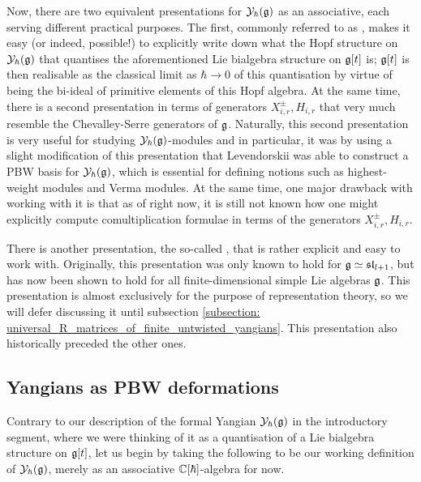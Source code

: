     Now, there are two equivalent presentations for $\mathcal{Y}_{\hbar}(\mathfrak{g})$ as an associative, each serving different practical purposes. The first, commonly referred to as , makes it easy (or indeed, possible!) to explicitly write down what the Hopf structure on $\mathcal{Y}_{\hbar}(\mathfrak{g})$ that quantises the aforementioned Lie bialgebra structure on $\mathfrak{g}[t]$ is; $\mathfrak{g}[t]$ is then realisable as the classical limit as $\hbar \to 0$ of this quantisation by virtue of being the bi-ideal of primitive elements of this Hopf algebra. At the same time, there is a second presentation in terms of generators $X_{i, r}^{\pm}, H_{i, r}$ that very much resemble the Chevalley-Serre generators of $\mathfrak{g}$. Naturally, this second presentation is very useful for studying $\mathcal{Y}_{\hbar}(\mathfrak{g})$-modules and in particular, it was by using a slight modification of this presentation that Levendorskii was able to construct a PBW basis for $\mathcal{Y}_{\hbar}(\mathfrak{g})$, which is essential for defining notions such as highest-weight modules and Verma modules. At the same time, one major drawback with working with it is that as of right now, it is still not known how one might explicitly compute comultiplication formulae in terms of the generators $X_{i, r}^{\pm}, H_{i, r}$. 

    There is another presentation, the so-called , that is rather explicit and easy to work with. Originally, this presentation was only known to hold for $\mathfrak{g} \simeq \mathfrak{sl}_{l + 1}$, but has now been shown to hold for all finite-dimensional simple Lie algebras $\mathfrak{g}$. This presentation is almost exclusively for the purpose of representation theory, so we will defer discussing it until subsection \ref{subsection: universal_R_matrices_of_finite_untwisted_yangians}. This presentation also historically preceded the other ones.

    \subsection{Yangians as PBW deformations}
        Contrary to our description of the formal Yangian $\mathcal{Y}_{\hbar}(\mathfrak{g})$ in the introductory segment, where we were thinking of it as a quantisation of a Lie bialgebra structure on $\mathfrak{g}[t]$, let us begin by taking the following to be our working definition of $\mathcal{Y}_{\hbar}(\mathfrak{g})$, merely as an associative $\mathbb{C}[\hbar]$-algebra for now.


